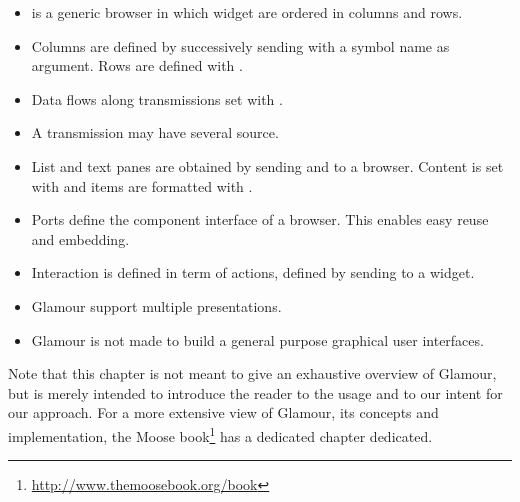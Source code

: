 \documentclass[a4paper,10pt,twoside]{book}
\begin{document}
\begin{itemize}
\item {} is a generic browser in which widget are ordered in columns and rows.
\item Columns are defined by successively sending  with a symbol name as argument. Rows are defined with .
\item Data flows along transmissions set with .
\item A transmission may have several source.
\item List and text panes are obtained by sending  and  to a browser. Content is set with  and items are formatted with .
\item Ports define the component interface of a browser. This enables easy reuse and embedding.
\item Interaction is defined in term of actions, defined by sending  to a widget.
\item Glamour support multiple presentations. 
\item Glamour is not made to build a general purpose graphical user interfaces. 
\end{itemize}

Note that this chapter 
is not meant to give an exhaustive overview of Glamour, but is merely
intended to introduce the reader to the usage and to our intent for
our approach. For a more extensive view of Glamour, its concepts and
implementation, the Moose
book\footnote{\url{http://www.themoosebook.org/book}} has a dedicated
chapter dedicated.

\ifx\wholebook\relax\else
   
   
\end{document}
